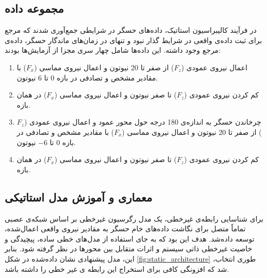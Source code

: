 \subsection{مجموعه داده}
در فرآیند کالیبراسیون استاتیک، داده‌های حسگر در شرایطی جمع‌آوری شدند که مرجع برای ثبت داده‌ی واقعی در شرایط گذار نبود و تنهای در زمان‌های ماندگار حسگر، داده‌ی مرجع وجود داشته. این داده‌ها شامل چهار سری مجزا از آزمایش‌ها بودند:
\begin{enumerate}
	\item 
	اعمال نیروی عمودی ($F_z$) از صفر تا 20 نیوتون و اعمال نیروی مماسی ($F_x$) با مقادیر مشخص و تصادفی در بازه 0 تا 6 نیوتون.
	\item 
	کم کردن نیروی عمودی ($F_z$) تا صفر نیوتون و اعمال نیروی مماسی ($F_x$) در همان بازه.
	\item
	چرخاندن حسگر به اندازه‌ی 180 درجه حول محور عمود و اعمال نیروی عمودی ($F_z$) از صفر تا 20 نیوتون و اعمال نیروی مماسی ($F_x$) با مقادیر مشخص و تصادفی در بازه 0 تا $-6$ نیوتون.
	\item
	کم کردن نیروی عمودی ($F_z$) تا صفر نیوتون و اعمال نیروی مماسی ($F_x$) در همان بازه.
\end{enumerate}


 \subsection{معماری و آموزش مدل استاتیکی}
برای شناسایی رابطه‌ی غیرخطی،  یک مدل رگرسیون غیرخطی بر اساس شبکه‌ی عصبی تماماً متصل برای نگاشت داده‌های خام حسگر به مقادیر نیروی واقعی اعمال‌شده، توسعه داده‌شد. هدف این بود که به جای استفاده از مدل‌های خطی ساده، پیچیدگی و خاصیت غیرخطی ذاتی سیستم و اثرات متقابل بین محورها در نظر گرفته شود.
بنابر این، مدل پیشنهادی نشان داده‌شده در شکل
\ref{fig:static_architecture}
 ،طوری انتخاب شد که افزونگی کافی برای استخراج این رابطه ی غیر خطی را داشته باشد. 

